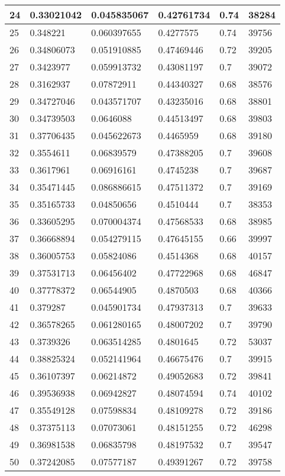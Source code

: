 \begin{longtable}{|l|l|l|l|l|l|}
24 & 0.33021042 & 0.045835067 & 0.42761734 & 0.74 & 38284 \\ \hline 
25 & 0.348221 & 0.060397655 & 0.4277575 & 0.74 & 39756 \\ \hline 
26 & 0.34806073 & 0.051910885 & 0.47469446 & 0.72 & 39205 \\ \hline 
27 & 0.3423977 & 0.059913732 & 0.43081197 & 0.7 & 39072 \\ \hline 
28 & 0.3162937 & 0.07872911 & 0.44340327 & 0.68 & 38576 \\ \hline 
29 & 0.34727046 & 0.043571707 & 0.43235016 & 0.68 & 38801 \\ \hline 
30 & 0.34739503 & 0.0646088 & 0.44513497 & 0.68 & 39803 \\ \hline 
31 & 0.37706435 & 0.045622673 & 0.4465959 & 0.68 & 39180 \\ \hline 
32 & 0.3554611 & 0.06839579 & 0.47388205 & 0.7 & 39608 \\ \hline 
33 & 0.3617961 & 0.06916161 & 0.4745238 & 0.7 & 39687 \\ \hline 
34 & 0.35471445 & 0.086886615 & 0.47511372 & 0.7 & 39169 \\ \hline 
35 & 0.35165733 & 0.04850656 & 0.4510444 & 0.7 & 38353 \\ \hline 
36 & 0.33605295 & 0.070004374 & 0.47568533 & 0.68 & 38985 \\ \hline 
37 & 0.36668894 & 0.054279115 & 0.47645155 & 0.66 & 39997 \\ \hline 
38 & 0.36005753 & 0.05824086 & 0.4514368 & 0.68 & 40157 \\ \hline 
39 & 0.37531713 & 0.06456402 & 0.47722968 & 0.68 & 46847 \\ \hline 
40 & 0.37778372 & 0.06544905 & 0.4870503 & 0.68 & 40366 \\ \hline 
41 & 0.379287 & 0.045901734 & 0.47937313 & 0.7 & 39633 \\ \hline 
42 & 0.36578265 & 0.061280165 & 0.48007202 & 0.7 & 39790 \\ \hline 
43 & 0.3739326 & 0.063514285 & 0.4801645 & 0.72 & 53037 \\ \hline 
44 & 0.38825324 & 0.052141964 & 0.46675476 & 0.7 & 39915 \\ \hline 
45 & 0.36107397 & 0.06214872 & 0.49052683 & 0.72 & 39841 \\ \hline 
46 & 0.39536938 & 0.06942827 & 0.48074594 & 0.74 & 40102 \\ \hline 
47 & 0.35549128 & 0.07598834 & 0.48109278 & 0.72 & 39186 \\ \hline 
48 & 0.37375113 & 0.07073061 & 0.48151255 & 0.72 & 46298 \\ \hline 
49 & 0.36981538 & 0.06835798 & 0.48197532 & 0.7 & 39547 \\ \hline 
50 & 0.37242085 & 0.07577187 & 0.49391267 & 0.72 & 39758 \\ \hline 
\end{longtable}